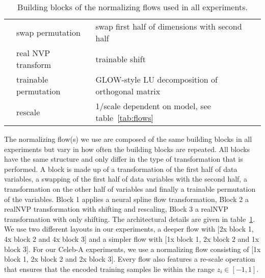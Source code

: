 \documentclass[10pt]{article} \usepackage[accepted]{tmlr}
\begin{document}
\begin{table}[h]
{\begin{tabular}{cll}
\multicolumn{1}{c|}{}                   & \multicolumn{1}{l|}{swap permutation}        & \multicolumn{1}{l}{swap first half of dimensions with second half}    \\ 
\multicolumn{1}{c|}{}                   & \multicolumn{1}{l|}{real NVP transform}      & \multicolumn{1}{l}{trainable shift}                                        \\
\multicolumn{1}{c|}{}                   & \multicolumn{1}{l|}{trainable permutation}   & \multicolumn{1}{l}{GLOW-style LU decomposition of orthogonal matrix}  \\ \hline
\multicolumn{1}{l|}{}                   & \multicolumn{1}{l|}{rescale}                 & \multicolumn{1}{l}{1/scale dependent on model, see table~\ref{tab:flows}}                                          
\end{tabular}}
\caption{\label{tab:flow_archi} Building blocks of the normalizing flows used in all experiments. }
\end{table}

The normalizing flow(s) we use are composed of the same building blocks in all experiments but vary in how often the building blocks are repeated. All blocks have the same structure and only differ in the type of transformation that is performed. A block is made up of a transformation of the first half of data variables, a swapping of the first half of data variables with the second half, a transformation on the other half of variables and finally a trainable permutation of the variables. Block 1 applies a neural spline flow transformation, Block 2 a realNVP transformation with shifting and rescaling, Block 3 a realNVP transformation with only shifting. The architectural details are given in table~\ref{tab:flow_archi}. We use two different layouts in our experiments, a deeper flow with [2x block 1, 4x block 2 and 4x block 3] and a simpler flow with [1x block 1, 2x block 2 and 1x block 3]. For our Celeb-A experiments, we use a normalizing flow consisting of [1x block 1, 2x block 2 and 2x block 3]. Every flow also features a re-scale operation that ensures that the encoded training samples lie within the range $z_i \in [-1,1]$. 
\end{document}
